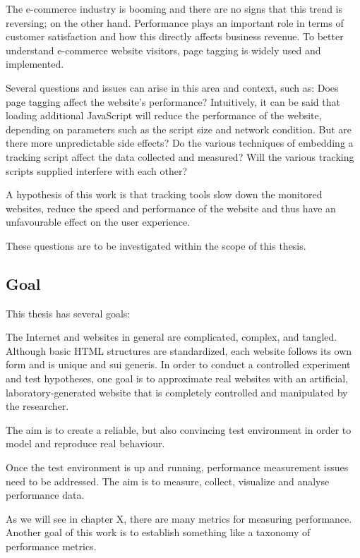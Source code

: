 The e-commerce industry is booming and there are no signs that this trend is reversing; on the other hand.
Performance plays an important role in terms of customer satisfaction and how this directly affects business revenue.
To better understand e-commerce website visitors, page tagging is widely used and implemented.

Several questions and issues can arise in this area and context, such as: Does page tagging affect the website's performance?
Intuitively, it can be said that loading additional JavaScript will reduce the performance of the website, depending on parameters such as the script size and network condition.
But are there more unpredictable side effects?
Do the various techniques of embedding a tracking script affect the data collected and measured?
Will the various tracking scripts supplied interfere with each other?

A hypothesis of this work is that tracking tools slow down the monitored websites, reduce the speed and performance of the website and thus have an unfavourable effect on the user experience.

These questions are to be investigated within the scope of this thesis.


\subsection{Goal}

This thesis has several goals:

The Internet and websites in general are complicated, complex, and tangled.
Although basic HTML structures are standardized, each website follows its own form and is unique and sui generis.
In order to conduct a controlled experiment and test hypotheses, one goal is to approximate real websites with an artificial, laboratory-generated website that is completely controlled and manipulated by the researcher.

The aim is to create a reliable, but also convincing test environment in order to model and reproduce real behaviour.

Once the test environment is up and running, performance measurement issues need to be addressed.
The aim is to measure, collect, visualize and analyse performance data.

As we will see in chapter X, there are many metrics for measuring performance.
Another goal of this work is to establish something like a taxonomy of performance metrics.





